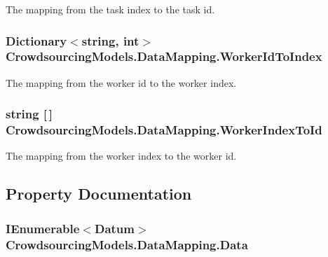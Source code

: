 The mapping from the task index to the task id. 

\hypertarget{class_crowdsourcing_models_1_1_data_mapping_a6c36a93683e83c27e0885ddd1df0fbc2}{}
\subsubsection[{Worker\+Id\+To\+Index}]{\setlength{\rightskip}{0pt plus 5cm}Dictionary$<$string, int$>$ Crowdsourcing\+Models.\+Data\+Mapping.\+Worker\+Id\+To\+Index}\label{class_crowdsourcing_models_1_1_data_mapping_a6c36a93683e83c27e0885ddd1df0fbc2}


The mapping from the worker id to the worker index. 

\hypertarget{class_crowdsourcing_models_1_1_data_mapping_a37f768a9661a8d4156f10b747cd0dec0}{}
\subsubsection[{Worker\+Index\+To\+Id}]{\setlength{\rightskip}{0pt plus 5cm}string \mbox{[}$\,$\mbox{]} Crowdsourcing\+Models.\+Data\+Mapping.\+Worker\+Index\+To\+Id}\label{class_crowdsourcing_models_1_1_data_mapping_a37f768a9661a8d4156f10b747cd0dec0}


The mapping from the worker index to the worker id. 



\subsection{Property Documentation}
\hypertarget{class_crowdsourcing_models_1_1_data_mapping_a94564530928ba781bdcf79c2aa2fa242}{}
\subsubsection[{Data}]{\setlength{\rightskip}{0pt plus 5cm}I\+Enumerable$<${\bf Datum}$>$ Crowdsourcing\+Models.\+Data\+Mapping.\+Data\hspace{0.3cm}{\ttfamily [get]}}\label{class_crowdsourcing_models_1_1_data_mapping_a94564530928ba781bdcf79c2aa2fa242}


